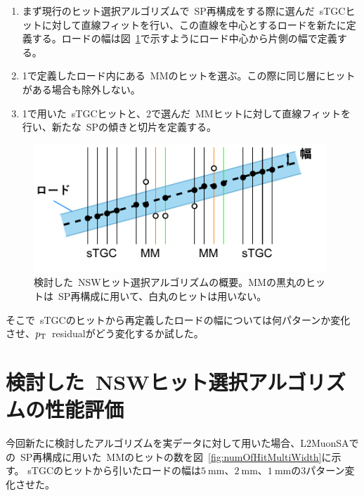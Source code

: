 \begin{enumerate}
    \item まず現行のヒット選択アルゴリズムで~SP再構成をする際に選んだ~sTGCヒットに対して直線フィットを行い、この直線を中心とするロードを新たに定義する。ロードの幅は図~\ref{fig:newSelectlg}で示すようにロード中心から片側の幅で定義する。
    \item 1で定義したロード内にある~MMのヒットを選ぶ。この際に同じ層にヒットがある場合も除外しない。
    \item 1で用いた~sTGCヒットと、2で選んだ~MMヒットに対して直線フィットを行い、新たな~SPの傾きと切片を定義する。
\end{enumerate}


\begin{figure}[H]
    \centering
    \includegraphics[clip, width=11cm]{fig/5/newHitSelectAlg.pdf}
    \caption{検討した~NSWヒット選択アルゴリズムの概要。MMの黒丸のヒットは~SP再構成に用いて、白丸のヒットは用いない。}
    \label{fig:newSelectlg}
\end{figure}


そこで~sTGCのヒットから再定義したロードの幅については何パターンか変化させ、$p_\mathrm{T}$~residualがどう変化するか試した。


\section{検討した~NSWヒット選択アルゴリズムの性能評価}\label{chapter5-5}
今回新たに検討したアルゴリズムを実データに対して用いた場合、L2MuonSAでの~SP再構成に用いた~MMのヒットの数を図~\ref{fig:numOfHitMultiWidth}に示す。
sTGCのヒットから引いたロードの幅は$\SI{5}{\mm}$、$\SI{2}{\mm}$、$\SI{1}{\mm}$の3パターン変化させた。

